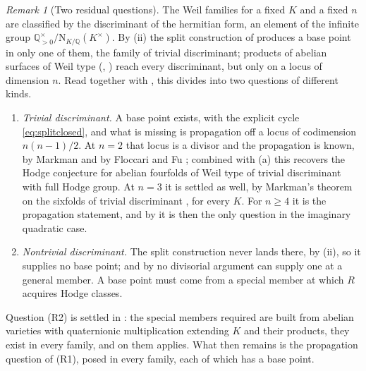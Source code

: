 \documentclass[11pt,reqno]{amsart}
\theoremstyle{plain}
\theoremstyle{definition}
\theoremstyle{remark}
\newtheorem{remark}[theorem]{Remark}
\newcommand{\QQ}{\mathbb{Q}}
\newcommand{\Nm}{\mathrm{N}}             %
\begin{document}
\begin{remark}[Two residual questions]\label{rem:residualmap}
The Weil families for a fixed $K$ and a fixed $n$ are classified by the
discriminant of the hermitian form, an element of the infinite group
$\QQ^{\times}_{>0}/\Nm_{K/\QQ}(K^{\times})$. By (ii) the
split construction of  produces a base point in only one of
them, the family of trivial discriminant; products of abelian surfaces of
Weil type (, ) reach every discriminant,
but only on a locus of dimension $n$. Read together with
, this divides  into two questions of
different kinds.
\begin{enumerate}[label=\textup{(R\arabic*)},leftmargin=2.8em,itemsep=2pt]
\item \emph{Trivial discriminant.} A base point exists, with the explicit
  cycle \eqref{eq:splitclosed}, and what is missing is propagation off a locus
  of codimension $n(n-1)/2$. At $n=2$ that locus is a divisor and the
  propagation is known, by Markman \cite{Mar25a,Mar25b} and by Floccari and Fu
  \cite{FF26}; combined with (a) this recovers the Hodge
  conjecture for abelian fourfolds of Weil type of trivial discriminant with
  full Hodge group. At $n=3$ it is settled as well, by Markman's theorem on
  the sixfolds of trivial discriminant \cite{Mar25a,Mar25b}, for every $K$.
  For $n\ge4$ it is the propagation statement, and by \cite[Proposition~2.13]{paperIII}
  it is then the only question in the imaginary quadratic case.
\item \emph{Nontrivial discriminant.} The split construction never lands
  there, by (ii), so it supplies no base
  point; and by  no divisorial argument can supply one at
  a general member. A base point must come from a special member at which $R$
  acquires Hodge classes.
\end{enumerate}
Question (R2) is settled in : the special members
required are built from abelian varieties with quaternionic multiplication
extending $K$ and their products, they exist in every family, and on them
 applies. What then remains is the propagation
question of (R1), posed in every family, each of which has a base point.
\end{remark}
\end{document}
